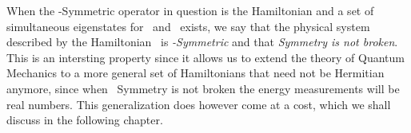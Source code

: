         When the \PT-Symmetric operator in question is the Hamiltonian \hH and a set of simultaneous eigenstates for \hH\ and \hPT\ exists, we say that the physical system described by the Hamiltonian \hH\ is \emph{\PT-Symmetric} and that \emph{\PT Symmetry is not broken}. This is an intersting property since it allows us to extend the theory of Quantum Mechanics to a more general set of Hamiltonians that need not be Hermitian anymore, since when \PT\ Symmetry is not broken the energy measurements will be real numbers. This generalization does however come at a cost, which we shall discuss in the following chapter.
